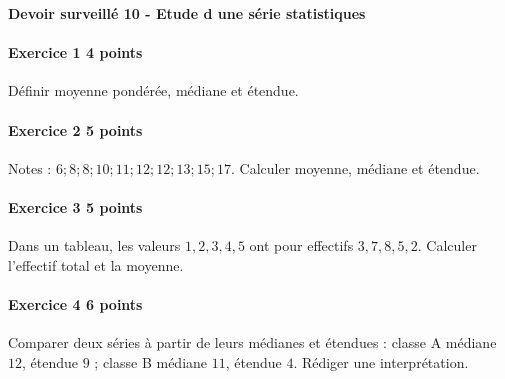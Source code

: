 \documentclass[a4paper,10pt]{article}
\newenvironment{exercice}[2]{\paragraph{Exercice #1 \hfill #2 points}\mbox{}\par}{\medskip}
\begin{document}
\begin{center}\Large\bfseries Devoir surveillé 10 - Etude d une série statistiques\end{center}
\vspace{2mm}
\begin{exercice}{1}{4}Définir moyenne pondérée, médiane et étendue.\end{exercice}\begin{exercice}{2}{5}Notes : $6;8;8;10;11;12;12;13;15;17$. Calculer moyenne, médiane et étendue.\end{exercice}\begin{exercice}{3}{5}Dans un tableau, les valeurs $1,2,3,4,5$ ont pour effectifs $3,7,8,5,2$. Calculer l'effectif total et la moyenne.\end{exercice}\begin{exercice}{4}{6}Comparer deux séries à partir de leurs médianes et étendues : classe A médiane $12$, étendue $9$ ; classe B médiane $11$, étendue $4$. Rédiger une interprétation.\end{exercice}
\end{document}
